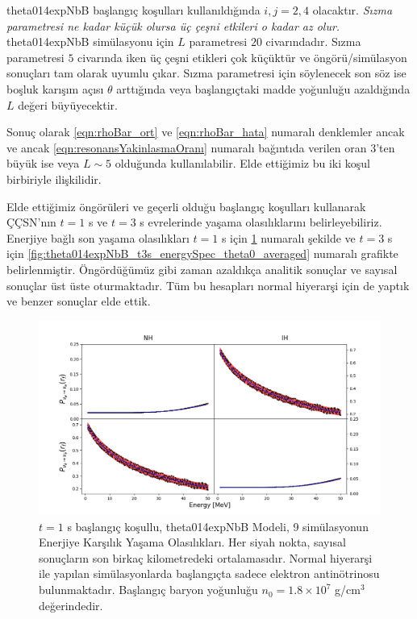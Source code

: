 theta014expNbB başlangıç koşulları kullanıldığında $ i,j = 2,4 $ olacaktır. \textit{Sızma parametresi ne kadar küçük olursa üç çeşni etkileri o kadar az olur.} theta014expNbB simülasyonu için $ L $ parametresi $ 20 $ civarındadır. Sızma parametresi $ 5 $ civarında iken üç çeşni etikleri çok küçüktür ve öngörü/simülasyon sonuçları tam olarak uyumlu çıkar. Sızma parametresi için söylenecek son söz ise boşluk karışım açısı $ \theta $ arttığında veya başlangıçtaki madde yoğunluğu azaldığında $ L $ değeri büyüyecektir. 

Sonuç olarak \eqref{eqn:rhoBar_ort} ve \eqref{eqn:rhoBar_hata} numaralı denklemler ancak ve ancak \eqref{eqn:resonansYakinlasmaOranı} numaralı bağıntıda verilen oran $ 3 $'ten büyük ise veya $ L \sim 5$ olduğunda kullanılabilir. Elde ettiğimiz bu iki koşul birbiriyle ilişkilidir. 

Elde ettiğimiz öngörüleri ve geçerli olduğu başlangıç koşulları kullanarak ÇÇSN'nın $ t=1 $ s ve $ t=3 $ s evrelerinde yaşama olasılıklarını belirleyebiliriz. Enerjiye bağlı son yaşama olasılıkları 
$ t=1 $ s için \ref{fig:theta014expNbB_t1s_energySpec_theta0_averaged} numaralı şekilde ve $ t=3 $ s için \ref{fig:theta014expNbB_t3s_energySpec_theta0_averaged} numaralı grafikte belirlenmiştir. Öngördüğümüz gibi zaman azaldıkça analitik sonuçlar ve sayısal sonuçlar üst üste oturmaktadır. Tüm bu hesapları normal hiyerarşi için de yaptık ve benzer sonuçlar elde ettik.

\begin{figure}[hbt!]
    \centering
    \includegraphics[width=\textwidth]{figures/theta014expNbB_t1s_energySpec_theta0_averaged.png}
    \caption[$ t=1 $ s başlangıç koşullu, theta014expNbB Modeli, 9 simülasyonun Enerjiye Karşılık Yaşama Olasılıkları.]{$ t=1 $ s başlangıç koşullu, theta014expNbB Modeli, 9 simülasyonun Enerjiye Karşılık Yaşama Olasılıkları. Her siyah nokta, sayısal sonuçların son birkaç kilometredeki ortalamasıdır. Normal hiyerarşi ile yapılan simülasyonlarda başlangıçta sadece elektron antinötrinosu bulunmaktadır. Başlangıç baryon yoğunluğu $ n_{0}=1.8\times 10^{7} $ g/cm$ ^{3} $ değerindedir.}
    \label{fig:theta014expNbB_t1s_energySpec_theta0_averaged}
\end{figure}

